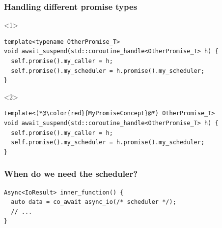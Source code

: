 \documentclass[aspectratio=169]{beamer}
\begin{document}
\begin{frame}[fragile]
  \frametitle{Handling different promise types}

  \begin{onlyenv}<1>
  \begin{lstlisting}[style=cpp20]
template<typename OtherPromise_T>
void await_suspend(std::coroutine_handle<OtherPromise_T> h) {
  self.promise().my_caller = h;
  self.promise().my_scheduler = h.promise().my_scheduler;
}
  \end{lstlisting}
  \end{onlyenv}
  \begin{onlyenv}<2>
  \begin{lstlisting}[style=cpp20]
template<(*@\color{red}{MyPromiseConcept}@*) OtherPromise_T>
void await_suspend(std::coroutine_handle<OtherPromise_T> h) {
  self.promise().my_caller = h;
  self.promise().my_scheduler = h.promise().my_scheduler;
}
  \end{lstlisting}
  \end{onlyenv}
\end{frame}

\begin{frame}[fragile]
  \frametitle{When do we need the scheduler?}
  
  \begin{lstlisting}[style=cpp20]
Async<IoResult> inner_function() {
  auto data = co_await async_io(/* scheduler */);
  // ...
}
  \end{lstlisting}
  
\end{frame}
\end{document}
